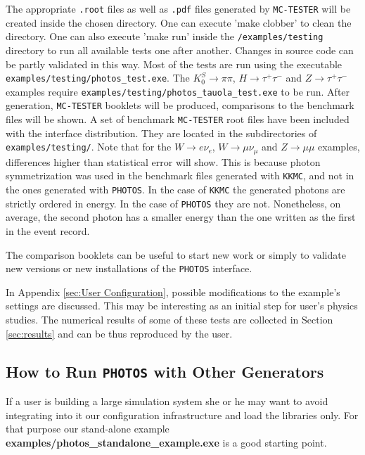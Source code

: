\documentclass[]{Photos_interface_design}
\begin{document}
The appropriate {\tt .root} files as well as {\tt .pdf} files generated by {\tt MC-TESTER}
will be created inside the chosen directory. One can execute 'make clobber' to
clean the directory. One can also execute 'make run' inside the {\tt /examples/testing}
directory to run all available tests one after another. Changes in source
code  can  be partly validated in this way.
Most of the tests are run using the executable {\tt examples/testing/photos\_test.exe}. The 
 $K_{0}^{S} \rightarrow \pi \pi$, $H \rightarrow \tau^+ \tau^-$ and $Z \rightarrow \tau^+ \tau^-$ examples 
require
{\tt examples/testing/photos\_tauola\_test.exe} to be run.
After generation, {\tt MC-TESTER} booklets will be produced,
 comparisons to the benchmark files will be shown.
A set of benchmark {\tt MC-TESTER} root files have been included with the interface
distribution. They are located in the subdirectories of {\tt examples/testing/}.
Note that for the $W \rightarrow e \nu_e$, 
$W \rightarrow \mu \nu_\mu$ and $Z \rightarrow \mu \mu$
examples,   differences higher than statistical error will show. 
This is because  photon symmetrization
was used in the benchmark files generated with {\tt KKMC}, and not in the ones 
generated with {\tt PHOTOS}.
In the case of {\tt KKMC} the generated photons are strictly ordered in energy. 
In the case of {\tt PHOTOS} they are not. Nonetheless, on average, 
the second photon has a smaller energy than the one written as the first
in the event record.


The comparison booklets can be useful 
to start new work or simply to 
validate new versions or new installations of the {\tt PHOTOS} interface.

In Appendix \ref{sec:User Configuration}, possible modifications to the  
example's settings are discussed. This may be interesting as an initial step for user's 
physics studies.  The numerical results of some of these tests are collected in Section \ref{sec:results}
and can be thus reproduced by the user.

\subsection{How to Run {\tt PHOTOS} with Other Generators}
If a user is building a large simulation system she or he may want to avoid
integrating into it our configuration infrastructure and load the libraries only. 
For that purpose our stand-alone 
example {\bf examples/photos\_standalone\_example.exe} is a good starting point.
\end{document}
